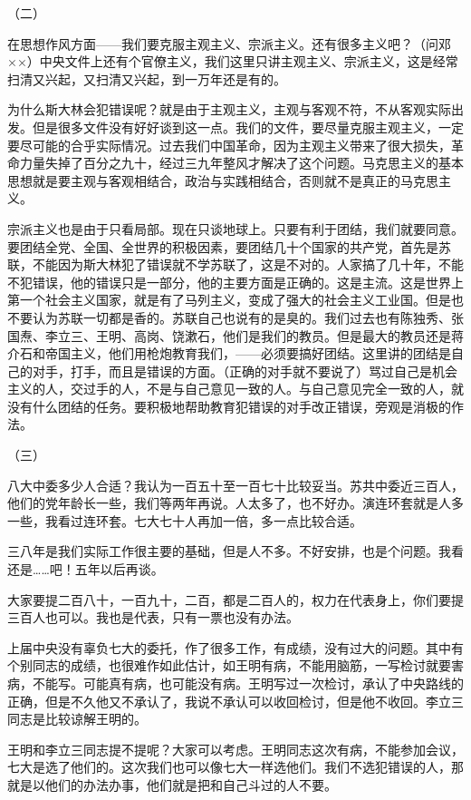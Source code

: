 （二）

在思想作风方面——我们要克服主观主义、宗派主义。还有很多主义吧？（问邓××）中央文件上还有个官僚主义，我们这里只讲主观主义、宗派主义，这是经常扫清又兴起，又扫清又兴起，到一万年还是有的。

为什么斯大林会犯错误呢？就是由于主观主义，主观与客观不符，不从客观实际出发。但是很多文件没有好好谈到这一点。我们的文件，要尽量克服主观主义，一定要尽可能的合乎实际情况。过去我们中国革命，因为主观主义带来了很大损失，革命力量失掉了百分之九十，经过三九年整风才解决了这个问题。马克思主义的基本思想就是要主观与客观相结合，政治与实践相结合，否则就不是真正的马克思主义。

宗派主义也是由于只看局部。现在只谈地球上。只要有利于团结，我们就要同意。要团结全党、全国、全世界的积极因素，要团结几十个国家的共产党，首先是苏联，不能因为斯大林犯了错误就不学苏联了，这是不对的。人家搞了几十年，不能不犯错误，他的错误只是一部分，他的主要方面是正确的。这是主流。这是世界上第一个社会主义国家，就是有了马列主义，变成了强大的社会主义工业国。但是也不要认为苏联一切都是香的。苏联自己也说有的是臭的。我们过去也有陈独秀、张国焘、李立三、王明、高岗、饶漱石，他们是我们的教员。但是最大的教员还是蒋介石和帝国主义，他们用枪炮教育我们，——必须要搞好团结。这里讲的团结是自己的对手，打手，而且是错误的方面。（正确的对手就不要说了）骂过自己是机会主义的人，交过手的人，不是与自己意见一致的人。与自己意见完全一致的人，就没有什么团结的任务。要积极地帮助教育犯错误的对手改正错误，旁观是消极的作法。

（三）

八大中委多少人合适？我认为一百五十至一百七十比较妥当。苏共中委近三百人，他们的党年龄长一些，我们等两年再说。人太多了，也不好办。演连环套就是人多一些，我看过连环套。七大七十人再加一倍，多一点比较合适。

三八年是我们实际工作很主要的基础，但是人不多。不好安排，也是个问题。我看还是……吧！五年以后再谈。

大家要提二百八十，一百九十，二百，都是二百人的，权力在代表身上，你们要提三百人也可以。我也是代表，只有一票也没有办法。

上届中央没有辜负七大的委托，作了很多工作，有成绩，没有过大的问题。其中有个别同志的成绩，也很难作如此估计，如王明有病，不能用脑筋，一写检讨就要害病，不能写。可能真有病，也可能没有病。王明写过一次检讨，承认了中央路线的正确，但是不久他又不承认了，我说不承认可以收回检讨，但是他不收回。李立三同志是比较谅解王明的。

王明和李立三同志提不提呢？大家可以考虑。王明同志这次有病，不能参加会议，七大是选了他们的。这次我们也可以像七大一样选他们。我们不选犯错误的人，那就是以他们的办法办事，他们就是把和自己斗过的人不要。

